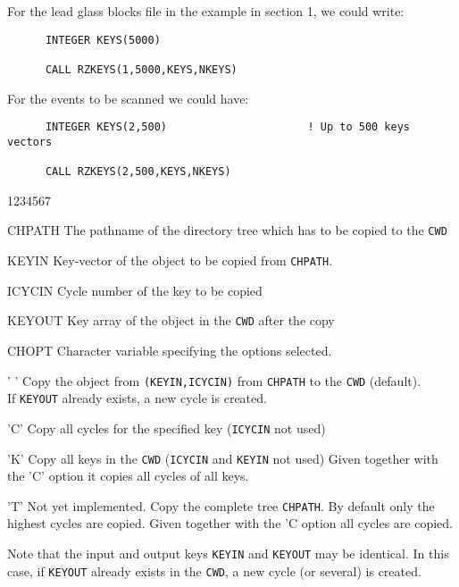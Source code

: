For the lead glass blocks file in the example in
section 1, we could write:
\begin{verbatim}
      INTEGER KEYS(5000)
 
      CALL RZKEYS(1,5000,KEYS,NKEYS)
\end{verbatim}
For the events to be scanned we could have:
\begin{verbatim}
      INTEGER KEYS(2,500)                      ! Up to 500 keys vectors
 
      CALL RZKEYS(2,500,KEYS,NKEYS)
\end{verbatim}


\begin{DLtt}{1234567}
\item[CHPATH]The pathname of the directory tree which has to be copied
to the {\tt CWD}
\item[KEYIN]Key-vector of the object to be copied from {\tt CHPATH}.
\item[ICYCIN]Cycle number of the key to be copied
\item[KEYOUT]Key array of the object in the {\tt CWD} after the copy
\item[CHOPT]Character variable specifying the options selected.
\begin{DLtt}{12}
\item[' ']Copy the object from {\tt (KEYIN,ICYCIN)} from
{\tt CHPATH} to the {\tt CWD} (default).\\
If {\tt KEYOUT} already exists, a new cycle is created.
\item['C']Copy all cycles for the specified key ({\tt ICYCIN} not used)
\item['K']Copy all keys in the {\tt CWD} ({\tt ICYCIN} and {\tt KEYIN} not used)
Given together with the 'C' option it copies all cycles of all keys.
\item['T']Not yet implemented. Copy the complete tree {\tt CHPATH}.
By default only the highest cycles are copied.
Given together with the 'C option all cycles are copied.
\end{DLtt}
\end{DLtt}

Note that the input and output keys {\tt KEYIN} and {\tt KEYOUT} may be
identical. In this case, if {\tt KEYOUT} already exists in the {\tt CWD}, a new
cycle (or several) is created.

